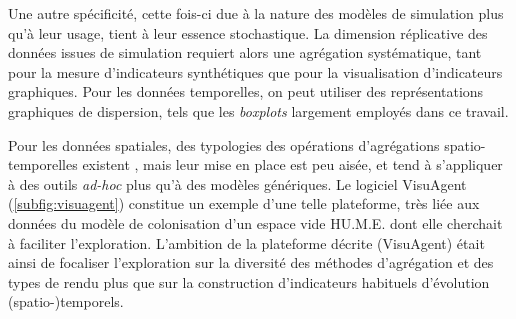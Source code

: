\noindent Une autre spécificité, cette fois-ci due à la nature des modèles de simulation plus qu'à leur usage, tient à leur essence stochastique.
La dimension réplicative des données issues de simulation requiert alors une agrégation systématique, tant pour la mesure d'indicateurs synthétiques que pour la visualisation d'indicateurs graphiques.
Pour les données temporelles, on peut utiliser des représentations graphiques de dispersion, tels que les \textit{boxplots} largement employés dans ce travail.

\noindent Pour les données spatiales, des typologies des opérations d'agrégations spatio-temporelles existent \autocite{bach_review_2014}, mais leur mise en place est peu aisée, et tend à s'appliquer à des outils \textit{ad-hoc} plus qu'à des modèles génériques.
Le logiciel VisuAgent \autocite{cura_visuagent_2014} (\cref{subfig:visuagent}) constitue un exemple d'une telle plateforme, très liée aux données du modèle de colonisation d'un espace vide \og HU.M.E.\fg{} \autocite{lenechet:hal-02025441} dont elle cherchait à faciliter l'exploration.
L'ambition de la plateforme décrite (\textsf{VisuAgent}) était ainsi de focaliser l'exploration sur la diversité des méthodes d'agrégation et des types de rendu plus que sur la construction d'indicateurs habituels d'évolution (spatio-)temporels.


